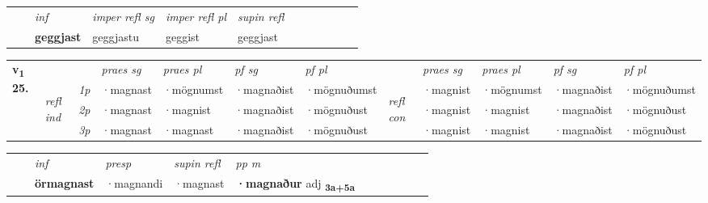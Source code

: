 \begin{tabular}{llllllllllll}
 & & \textit{inf}   & \textit{imper refl sg} & \textit{imper refl pl}   & \textit{supin refl}      \\*
  & & \textbf{geggjast}    & geggjastu & geggist   & geggjast  \\*
\cmidrule{1-12}
\end{tabular}



\begin{tabular}{llllllllllll} \toprule
\multirow{4}{*}{{{\textbf{v{\textsubscript{1}}} \Large{\textbf{25.}}}}}  & &   &  \textit{praes sg}  & \textit{praes pl}  &\textit{pf sg} & \textit{pf pl} &  &  \textit{praes sg}  & \textit{praes pl}  & \textit{pf sg} & \textit{pf pl } \\*
	\cmidrule{4-7} \cmidrule{9-12}
 &\multirow{3}{*}{\begin{turn}{90}\textit{refl ind}\end{turn}} & {\textit{1p}} & ·magnast & ·mögnumst    & ·magnaðist & ·mögnuðumst & \multirow{3}{*}{\begin{turn}{90}\textit{refl con}\end{turn}}  &·magnist & ·mögnumst & ·magnaðist & ·mögnuðumst\\*
 &&  {\textit{2p}} &  ·magnast  & ·magnist   & ·magnaðist & ·mögnuðust & &·magnist & ·magnist & ·magnaðist & ·mögnuðust \\*
& &  {\textit{3p}} & ·magnast & ·magnast   & ·magnaðist & ·mögnuðust & & ·magnist & ·magnist& ·magnaðist & ·mögnuðust  \\*
\cmidrule{4-7} \cmidrule{9-12}
\end{tabular}


\begin{tabular}{llllllllllll}
 & & \textit{inf}     & \textit{presp}  & \textit{supin refl} & \textit{pp m}     \\*
  & & \textbf{örmagnast}      & ·magnandi  & ·magnast & \textbf{·magnaður} adj \textbf{\textsubscript{3a+5a}} \\*
\cmidrule{1-12}
\end{tabular}



